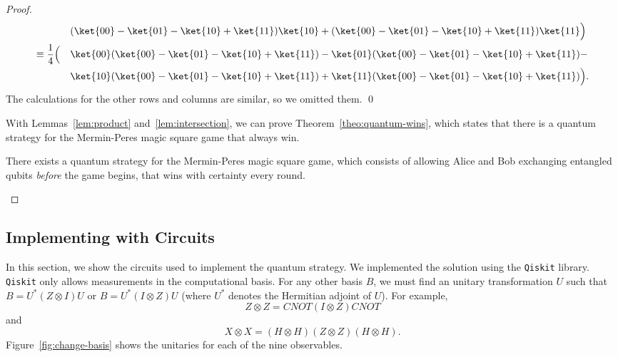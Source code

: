 \documentclass{llncs}
\newcommand{\cnot}{\mathit{CNOT}}
\begin{document}
\begin{proof}
\begin{alignat}{2}
    & &&(\ket{00} - \ket{01} - \ket{10} + \ket{11}) \ket{10} +
      (\ket{00} - \ket{01} - \ket{10} + \ket{11}) \ket{11}
    \Bigr) \nonumber \\
    \equiv\;
    & \frac{1}{4} \Bigl(
      &&\ket{00} (\ket{00} - \ket{01} - \ket{10} + \ket{11}) -
        \ket{01} (\ket{00} - \ket{01} - \ket{10} + \ket{11}) - \nonumber \\
    & &&\ket{10} (\ket{00} - \ket{01} - \ket{10} + \ket{11}) +
         \ket{11} (\ket{00} - \ket{01} - \ket{10} + \ket{11})
         \Bigr).
  \end{alignat}
  The calculations for the other rows and columns are similar, so we omitted them.
  \qed

  With Lemmas~\ref{lem:product} and~\ref{lem:intersection}, we can prove
  Theorem~\ref{theo:quantum-wins}, which states that there is a quantum strategy
  for the Mermin-Peres magic square game that always win.

  \begin{theorem}
    \label{theo:quantum-wins}
    There exists a quantum strategy for the Mermin-Peres magic square
    game, which consists of allowing Alice and Bob exchanging
    entangled qubits \emph{before} the game begins, that wins with
    certainty every round.
  \end{theorem}
\end{proof}

\subsection{Implementing with Circuits}
In this section, we show the circuits used to implement the quantum
strategy. We implemented the solution using the \texttt{Qiskit}
library. \texttt{Qiskit} only allows measurements in the computational
basis. For any other basis \(B\), we must find an unitary
transformation \(U\) such that \(B = U^{*} (Z \otimes I) U\) or
\(B = U^{*} (I \otimes Z) U\) (where \(U^{*}\) denotes the Hermitian
adjoint of \(U\)). For example,
\begin{equation}
  Z \otimes Z = \cnot{} (I \otimes Z) \cnot{}
\end{equation}
and
\begin{equation}
  X \otimes X = (H \otimes H) (Z \otimes Z) (H \otimes H).
\end{equation}
Figure~\ref{fig:change-basis} shows the unitaries for each of
the nine observables.
\end{document}
